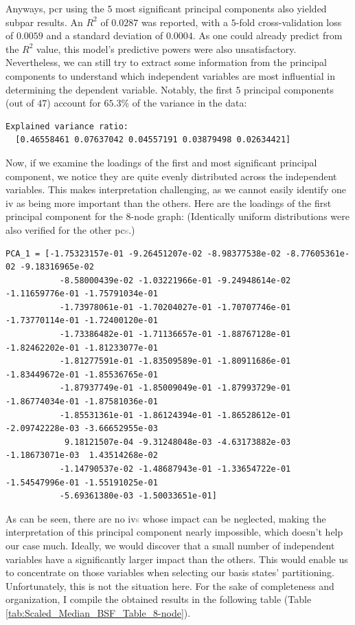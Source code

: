Anyways, \acrshort{pcr} using the $5$ most significant principal components also yielded subpar results. An $R^2$ of $0.0287$ was reported, with a $5$-fold cross-validation loss of $0.0059$ and a standard deviation of $0.0004$. As one could already predict from the $R^2$ value, this model's predictive powers were also unsatisfactory. Nevertheless, we can still try to extract some information from the principal components to understand which independent variables are most influential in determining the dependent variable. Notably, the first $5$ principal components (out of $47$) account for $65.3\%$ of the variance in the data:
\begin{lstlisting}[caption={Explained variance ratio for the first $5$ \acrshort{pc}\textcolor{gray}{s} ($8$-node graph).}, captionpos=b, style=DOS]
  Explained variance ratio:
  [0.46558461 0.07637042 0.04557191 0.03879498 0.02634421]
\end{lstlisting}
Now, if we examine the loadings of the first and most significant principal component, we notice they are quite evenly distributed across the independent variables. This makes interpretation challenging, as we cannot easily identify one \acrshort{iv} as being more important than the others. Here are the loadings of the first principal component for the $8$-node graph: (Identically uniform distributions were also verified for the other \acrshort{pc}\textcolor{gray}{s}.)
\begin{lstlisting}[caption={Loadings of the first \acrshort{pc}, for the $8$-node graph.}, captionpos=b, style=DOS]
  PCA_1 = [-1.75323157e-01 -9.26451207e-02 -8.98377538e-02 -8.77605361e-02 -9.18316965e-02
           -8.58000439e-02 -1.03221966e-01 -9.24948614e-02 -1.11659776e-01 -1.75791034e-01
           -1.73978061e-01 -1.70204027e-01 -1.70707746e-01 -1.73770114e-01 -1.72400120e-01
           -1.73386482e-01 -1.71136657e-01 -1.88767128e-01 -1.82462202e-01 -1.81233077e-01
           -1.81277591e-01 -1.83509589e-01 -1.80911686e-01 -1.83449672e-01 -1.85536765e-01
           -1.87937749e-01 -1.85009049e-01 -1.87993729e-01 -1.86774034e-01 -1.87581036e-01
           -1.85531361e-01 -1.86124394e-01 -1.86528612e-01 -2.09742228e-03 -3.66652955e-03
            9.18121507e-04 -9.31248048e-03 -4.63173882e-03 -1.18673071e-03  1.43514268e-02
           -1.14790537e-02 -1.48687943e-01 -1.33654722e-01 -1.54547996e-01 -1.55191025e-01
           -5.69361380e-03 -1.50033651e-01]
  \end{lstlisting}
As can be seen, there are no \acrshort{iv}\textcolor{gray}{s} whose impact can be neglected, making the interpretation of this principal component nearly impossible, which doesn't help our case much. Ideally, we would discover that a small number of independent variables have a significantly larger impact than the others. This would enable us to concentrate on those variables when selecting our basis states' partitioning. Unfortunately, this is not the situation here. For the sake of completeness and organization, I compile the obtained results in the following table (Table \ref{tab:Scaled_Median_BSF_Table_8-node}).
